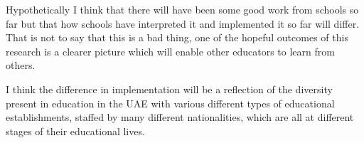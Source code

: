 Hypothetically I think that there will have been some good work from schools so far but that how schools have interpreted it and implemented it so far will differ. That is not to say that this is a bad thing, one of the hopeful outcomes of this research is a clearer picture which will enable other educators to learn from others.

I think the difference in implementation will be a reflection of the diversity present in education in the UAE with various different types of educational establishments, staffed by many different nationalities, which are all at different stages of their educational lives.
